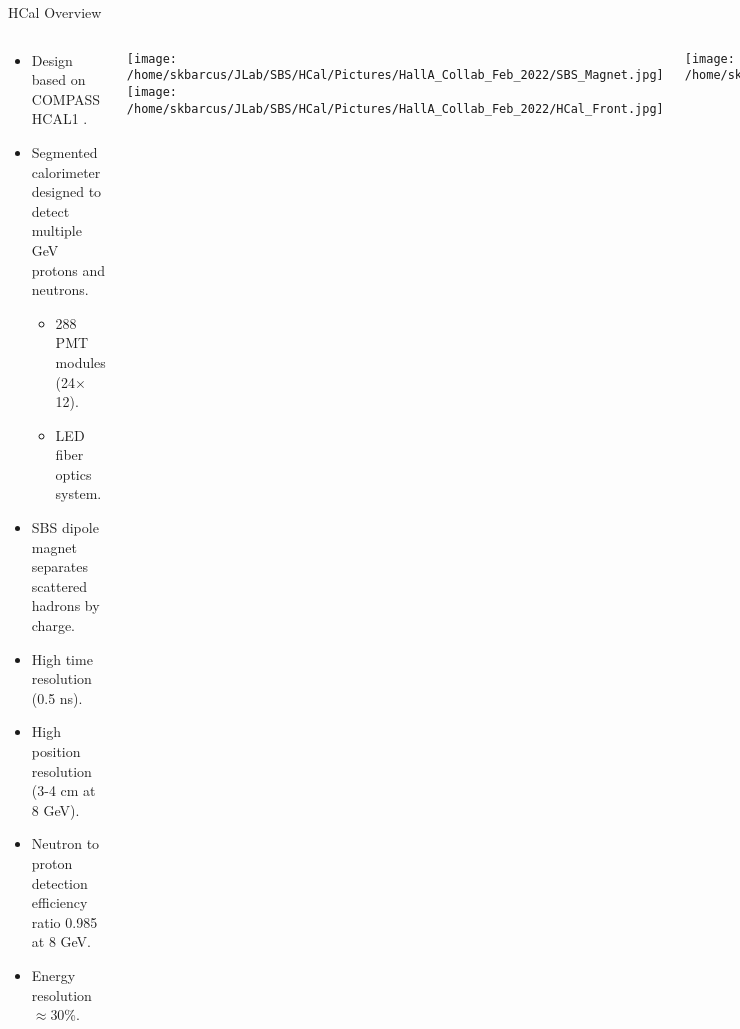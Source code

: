 \documentclass[10pt]{beamer}
\begin{document}
\begin{frame}{HCal Overview}
	\vspace{-4mm}
    \begin{columns}[T,onlytextwidth]
  	
  	\begin{center}
  	
	\begin{itemize}
		\item Design based on COMPASS HCAL1 \parencite{hcal1}.
		\item Segmented calorimeter designed to detect multiple GeV protons and neutrons.
		\begin{itemize}\itemsep0pt \parskip0pt 
			\item[--] 288 PMT modules (24$\times$12).
			\item[--] LED fiber optics system.
		\end{itemize}
		\item SBS dipole magnet separates scattered hadrons by charge.
		\item {}\alert{High time resolution (0.5 ns).} 
		\item {}\alert{High position resolution (3-4 cm at 8 GeV).}
		\item {}\alert{Neutron to proton detection efficiency ratio 0.985 at 8 GeV.}
		\item Energy resolution $\approx$30\%.
	\end{itemize}
	
	\end{center}
	
	\vspace{-4mm}
	 \begin{center}
  		\texttt{[image: /home/skbarcus/JLab/SBS/HCal/Pictures/HallA\_Collab\_Feb\_2022/SBS\_Magnet.jpg]}
  		\texttt{[image: /home/skbarcus/JLab/SBS/HCal/Pictures/HallA\_Collab\_Feb\_2022/HCal\_Front.jpg]}
  	\end{center}
  	
  	\begin{center}
  	\texttt{[image: /home/skbarcus/JLab/SBS/HCal/Pictures/20190508\_170610.jpg]}
  	\end{center}
	\end{columns}

\end{frame}
\end{document}
